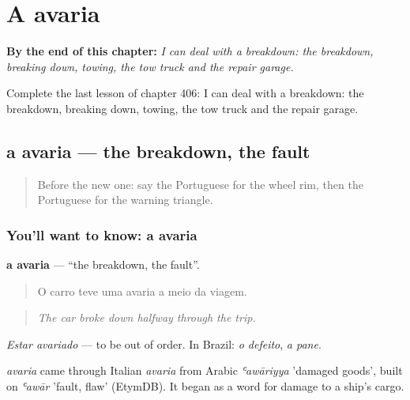 
\chapter{A avaria}
\label{ch:pt-a-avaria}

\begin{chapteropening}
\textbf{By the end of this chapter:} \emph{I can deal with a breakdown: the breakdown, breaking down, towing, the tow truck and the repair garage.}

Complete the last lesson of chapter 406: I can deal with a breakdown: the breakdown, breaking down, towing, the tow truck and the repair garage.
\end{chapteropening}

\section[a avaria]{a avaria — the breakdown, the fault}

\label{lesson:PT-C406-avaria}



\begin{quote}
Before the new one: say the Portuguese for the wheel rim, then the Portuguese for the warning triangle.
\end{quote}

\subsection*{You'll want to know: a avaria}
\textbf{a avaria} — \textquotedblleft{}the breakdown, the fault\textquotedblright{}.

\begin{quote}
O carro teve uma avaria a meio da viagem.
\end{quote}

\begin{quote}
\emph{The car broke down halfway through the trip.}
\end{quote}

\emph{Estar avariado} — to be out of order. In Brazil: \emph{o defeito}, \emph{a pane}.

\begin{cousinweb}
\emph{avaria} came through Italian \emph{avaria} from Arabic \emph{ʿawāriyya} 'damaged goods', built on \emph{ʿawār} 'fault, flaw' (EtymDB). It began as a word for damage to a ship's cargo.
\end{cousinweb}

